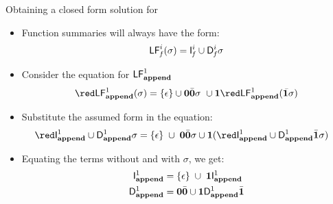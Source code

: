 \documentclass[xcolor=x11names,compress,mathserif]{beamer}
\renewcommand{\(}{\begin{columns}}
\renewcommand{\)}{\end{columns}}
\newcommand{\<}[1]{\begin{column}{#1}}
\renewcommand{\>}{\end{column}}
\begin{document}
\begin{frame}{Obtaining a closed form solution for  \Lfonly}
  \begin{itemize}
  \item<1-> Function summaries will always have the form:
    \begin{align*}
      \mathsf{LF}_{\mathit f}^{i}( {\mathit \sigma}) = \mathsf{I}_{\mathit f}^{i} \cup \mathsf{D}_{\mathit f}^{i}\sigma
    \end{align*}
\item<2-> Consider the  equation for $\mathsf{LF}^{1}_{\mathbf{append}}$
    \begin{align*}
{\red\Lf{\append}{1}{\sigma}} = \{\epsilon\} \cup \acar\bcar\sigma ~
\cup \acdr{\red \Lf{\append}{1}{\bcdr\sigma}}
    \end{align*}
\item<3->Substitute the assumed  form in the equation:
    \begin{align*}
        {\red\Uf{\append}{1}   \cup    \Df{\append}{1}\sigma}
        &= \{\epsilon\}\;  \cup\;
      \acar\bcar\sigma\cup  
      \acdr({\red\Uf{\append}{1} \cup
      \Df{\append}{1}\bcdr\sigma})
    \end{align*}
\item<3-> Equating the terms without and with $\sigma$, we get:  
    \begin{align*}
        \mathsf{I}_{\mathit {\mathbf{append}}}^{1} &= \{\epsilon\}\;  \cup\;
      \mathbf{1}\mathsf{I}_{\mathit {\mathbf{append}}}^{1}\\
  \mathsf{D}_{\mathit {\mathbf{append}}}^{1} &= \mathbf{0}\bar{\mathbf{0}}\cup\mathbf{1} \mathsf{D}_{\mathit {\mathbf{append}}}^{1}\bar{\mathbf{1}}
    \end{align*}
  \end{itemize}
\end{frame}
\end{document}
